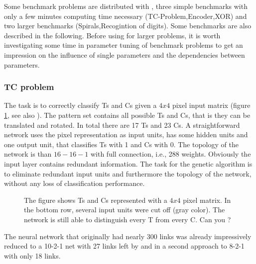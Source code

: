 Some benchmark problems are distributed with \ENZO, three simple
benchmarks with only a few minutes computing time necessary
(TC-Problem,Encoder,XOR)
and two larger benchmarks (Spirals,Recogintion of digits). 
Some benchmarks are also described in the following.
Before using \ENZO for larger problems, it is worth investigating some
time in parameter tuning of benchmark problems to get an impression
on the influence of single parameters and the dependencies between parameters.



\subsubsection{\bf TC problem}
The task is to correctly classify Ts and Cs given a $4x4$ pixel input matrix
(figure \ref{tc}, see also \cite{McDonnell&Waagen93}). The pattern set contains
all possible Ts and Cs, that is they
can be translated and rotated. In total there are 17 Ts and 23 Cs.
A straightforward network uses the pixel representation as input units, has some
hidden units and one output unit, that classifies Ts with 1 and Cs with 0.
The topology of the network is than $16-16-1$ with full connection, i.e., 288 weights.
Obviously the input layer contains redundant information.
The task for the genetic algorithm is to eliminate redundant input units
and furthermore the topology of the network, without any loss of classification
performance.

\begin{figure}[htb]
\centerline{ }

\caption[The TC - Problem ]{\label{tc}
{\small The figure shows Ts and Cs represented with a
	$4x4$ pixel matrix. In the bottom row, several
	input units were cut off (gray color). The network
	is still able to distinguish every T from every C.
	Can you ?
}}
\end{figure}


 The neural network that originally
had nearly 300 links was already impressively reduced to a 10-2-1 net
with 27 links  left by
\ENZO and in a second approach to 8-2-1
with only 18 links.

